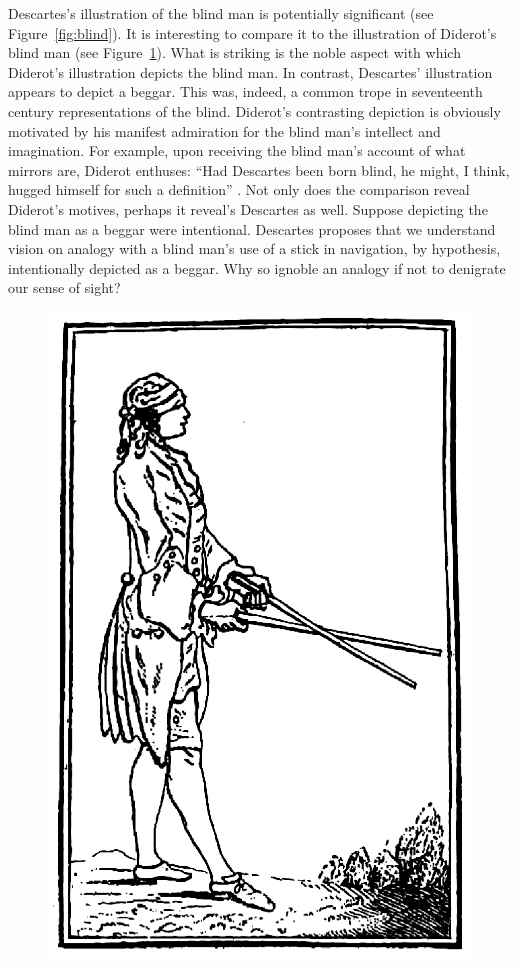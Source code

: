 Descartes's illustration of the blind man is potentially significant (see Figure~\ref{fig:blind}). It is interesting to compare it to the illustration of Diderot's blind man (see Figure~\ref{fig:diderot_blind}). What is striking is the noble aspect with which Diderot's illustration depicts the blind man. In contrast, Descartes' illustration appears to depict a beggar. This was, indeed, a common trope in seventeenth century representations of the blind. Diderot's contrasting depiction is obviously motivated by his manifest admiration for the blind man's intellect and imagination. For example, upon receiving the blind man's account of what mirrors are, Diderot enthuses: ``Had Descartes been born blind, he might, I think, hugged himself for such a definition'' \citep[72]{Jourdain:1916aa}. Not only does the comparison reveal Diderot's motives, perhaps it reveal's Descartes as well. Suppose depicting the blind man as a beggar were intentional. Descartes proposes that we understand vision on analogy with a blind man's use of a stick in navigation, by hypothesis, intentionally depicted as a beggar. Why so ignoble an analogy if not to denigrate our sense of sight?



\begin{figure}[htbp]
	\centering
		\includegraphics[scale=0.5]{graphics/diderot_blind.jpeg}
	\caption{\citealt{Jourdain:1916aa}}
	\label{fig:diderot_blind}
\end{figure}

